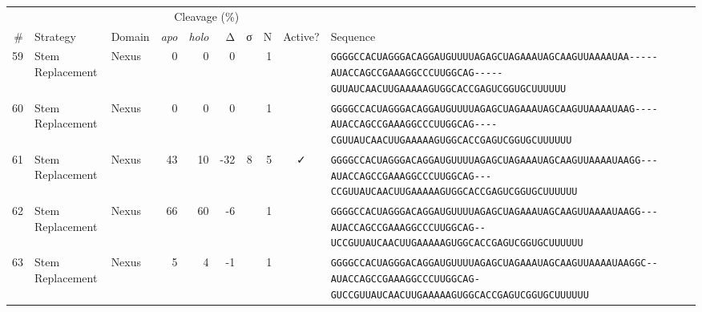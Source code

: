 \begin{tabular}{rllrrrrrcl}
\toprule

&
&
&
\multicolumn{4}{c}{Cleavage (\%)} &
&
&
\\
\cmidrule(r){4-7}

\# &
Strategy &
Domain &
\multicolumn{1}{r}{\textit{apo}} &
\multicolumn{1}{r}{\textit{holo}} &
\multicolumn{1}{r}{Δ} &
\multicolumn{1}{r}{σ} &
N &
Active? &
Sequence \\
\midrule

 59 & Stem Replacement & Nexus & 0 & 0 & 0 &  & 1 &  &
 \color{ucsfdarkgrey}\verb|GGGGCCACUAGGGACAGGAU|\color{ucsforange}\verb|GUUUUA|\color{ucsfblue}\verb|GAGCUAGAAAUAGCAAGU|\color{ucsforange}\verb|UAAAAUAA|\color{ucsfnavy}\verb|-----|\color{ucsfpurple}\verb|AUACCAGCCGAAAGGCCCUUGGCAG|\color{ucsfnavy}\verb|-----GU|\color{ucsforange}\verb|UAUCA|\color{ucsfteal}\verb|ACUUGAAAAAGU|\color{ucsforange}\verb|GGCACCGAGUCGGUGCUUUUUU| \\

 60 & Stem Replacement & Nexus & 0 & 0 & 0 &  & 1 &  &
 \color{ucsfdarkgrey}\verb|GGGGCCACUAGGGACAGGAU|\color{ucsforange}\verb|GUUUUA|\color{ucsfblue}\verb|GAGCUAGAAAUAGCAAGU|\color{ucsforange}\verb|UAAAAUAA|\color{ucsfnavy}\verb|G----|\color{ucsfpurple}\verb|AUACCAGCCGAAAGGCCCUUGGCAG|\color{ucsfnavy}\verb|----CGU|\color{ucsforange}\verb|UAUCA|\color{ucsfteal}\verb|ACUUGAAAAAGU|\color{ucsforange}\verb|GGCACCGAGUCGGUGCUUUUUU| \\

 61 & Stem Replacement & Nexus & 43 & 10 & -32 & 8 & 5 & ✓ &
 \color{ucsfdarkgrey}\verb|GGGGCCACUAGGGACAGGAU|\color{ucsforange}\verb|GUUUUA|\color{ucsfblue}\verb|GAGCUAGAAAUAGCAAGU|\color{ucsforange}\verb|UAAAAUAA|\color{ucsfnavy}\verb|GG---|\color{ucsfpurple}\verb|AUACCAGCCGAAAGGCCCUUGGCAG|\color{ucsfnavy}\verb|---CCGU|\color{ucsforange}\verb|UAUCA|\color{ucsfteal}\verb|ACUUGAAAAAGU|\color{ucsforange}\verb|GGCACCGAGUCGGUGCUUUUUU| \\

 62 & Stem Replacement & Nexus & 66 & 60 & -6 &  & 1 &  &
 \color{ucsfdarkgrey}\verb|GGGGCCACUAGGGACAGGAU|\color{ucsforange}\verb|GUUUUA|\color{ucsfblue}\verb|GAGCUAGAAAUAGCAAGU|\color{ucsforange}\verb|UAAAAUAA|\color{ucsfnavy}\verb|GG---|\color{ucsfpurple}\verb|AUACCAGCCGAAAGGCCCUUGGCAG|\color{ucsfnavy}\verb|--UCCGU|\color{ucsforange}\verb|UAUCA|\color{ucsfteal}\verb|ACUUGAAAAAGU|\color{ucsforange}\verb|GGCACCGAGUCGGUGCUUUUUU| \\

 63 & Stem Replacement & Nexus & 5 & 4 & -1 &  & 1 &  &
 \color{ucsfdarkgrey}\verb|GGGGCCACUAGGGACAGGAU|\color{ucsforange}\verb|GUUUUA|\color{ucsfblue}\verb|GAGCUAGAAAUAGCAAGU|\color{ucsforange}\verb|UAAAAUAA|\color{ucsfnavy}\verb|GGC--|\color{ucsfpurple}\verb|AUACCAGCCGAAAGGCCCUUGGCAG|\color{ucsfnavy}\verb|-GUCCGU|\color{ucsforange}\verb|UAUCA|\color{ucsfteal}\verb|ACUUGAAAAAGU|\color{ucsforange}\verb|GGCACCGAGUCGGUGCUUUUUU| \\


\end{tabular}

